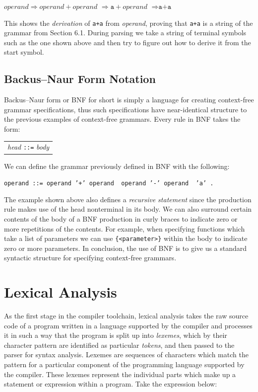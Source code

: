\documentclass[a4paper, 11pt]{article}
\begin{document}
\begin{center}
	$operand \Rightarrow operand+operand$ $\Rightarrow \texttt{a}+operand$ $\Rightarrow \texttt{a+a}$
\end{center}

This shows the \textit{derivation} of \texttt{a+a} from \textit{operand}, proving that \texttt{a+a} is a string of the grammar from Section 6.1. During parsing we take a string of terminal symbols such as the one shown above and then try to figure out how to derive it from the start symbol.

\subsection{Backus–Naur Form Notation}
Backus–Naur form or BNF for short is simply a language for creating context-free grammar specifications, thus such specifications have near-identical structure to the previous examples of context-free grammars. Every rule in BNF takes the form:

\begin{center}
	\begin{tabular}{l}
		\textit{head} \texttt{::=} \textit{body}
	\end{tabular}
\end{center}

\noindent We can define the grammar previously defined in BNF with the following:

\begin{center}
	\texttt{operand ::= operand '+' operand \textbar\ operand '-' operand \textbar\ 'a' .}
\end{center}

\noindent The example shown above also defines a \textit{recursive statement} since the production rule makes use of the head nonterminal in its body. We can also surround certain contents of the body of a BNF production in curly braces to indicate zero or more repetitions of the contents. For example, when specifying functions which take a list of parameters we can use \texttt{\{<parameter>\}} within the body to indicate zero or more parameters. In conclusion, the use of BNF is to give us a standard syntactic structure for specifying context-free grammars.


\clearpage
\newpage\section{Lexical Analysis}
As the first stage in the compiler toolchain, lexical analysis takes the raw source code of a program written in a language supported by the compiler and processes it in such a way that the program is split up into \textit{lexemes}, which by their character pattern are identified as particular \textit{tokens}, and then passed to the parser for syntax analysis. Lexemes are sequences of characters which match the pattern for a particular component of the programming language supported by the compiler. These lexemes represent the individual parts which make up a statement or expression within a program. Take the expression below:
\end{document}
